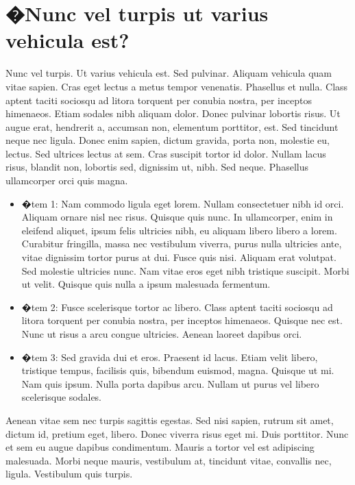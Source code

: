 %
%
\section[�Nunc vel turpis ut varius vehicula est sed pulvinar?]{
	�Nunc vel turpis ut varius vehicula est?
}

Nunc vel turpis. Ut varius vehicula est. Sed pulvinar. Aliquam vehicula quam vitae sapien. Cras eget lectus a metus tempor venenatis. Phasellus et nulla. Class aptent taciti sociosqu ad litora torquent per conubia nostra, per inceptos himenaeos. Etiam sodales nibh aliquam dolor. Donec pulvinar lobortis risus. Ut augue erat, hendrerit a, accumsan non, elementum porttitor, est. Sed tincidunt neque nec ligula. Donec enim sapien, dictum gravida, porta non, molestie eu, lectus. Sed ultrices lectus at sem. Cras suscipit tortor id dolor. Nullam lacus risus, blandit non, lobortis sed, dignissim ut, nibh. Sed neque. Phasellus ullamcorper orci quis magna.

\begin{itemize}
	\item{
		�tem 1: Nam commodo ligula eget lorem. Nullam consectetuer nibh id orci. Aliquam ornare nisl nec risus. Quisque quis nunc. In ullamcorper, enim in eleifend aliquet, ipsum felis ultricies nibh, eu aliquam libero libero a lorem. Curabitur fringilla, massa nec vestibulum viverra, purus nulla ultricies ante, vitae dignissim tortor purus at dui. Fusce quis nisi. Aliquam erat volutpat. Sed molestie ultricies nunc. Nam vitae eros eget nibh tristique suscipit. Morbi ut velit. Quisque quis nulla a ipsum malesuada fermentum.
	}
	\item{
		�tem 2: Fusce scelerisque tortor ac libero. Class aptent taciti sociosqu ad litora torquent per conubia nostra, per inceptos himenaeos. Quisque nec est. Nunc ut risus a arcu congue ultricies. Aenean laoreet dapibus orci.
	}
	\item{
		�tem 3: Sed gravida dui et eros. Praesent id lacus. Etiam velit libero, tristique tempus, facilisis quis, bibendum euismod, magna. Quisque ut mi. Nam quis ipsum. Nulla porta dapibus arcu. Nullam ut purus vel libero scelerisque sodales.
	}
\end{itemize}

Aenean vitae sem nec turpis sagittis egestas. Sed nisi sapien, rutrum sit amet, dictum id, pretium eget, libero. Donec viverra risus eget mi. Duis porttitor. Nunc et sem eu augue dapibus condimentum. Mauris a tortor vel est adipiscing malesuada. Morbi neque mauris, vestibulum at, tincidunt vitae, convallis nec, ligula. Vestibulum quis turpis.



